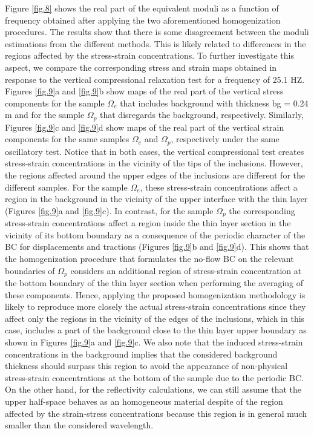 \documentclass[draft]{agujournal2019}
\begin{document}
Figure \ref{fig.8} shows the real part of the  equivalent moduli as a function of frequency obtained after applying the two aforementioned homogenization procedures.
The results show that there is some disagreement between the moduli estimations from the different methods.
This is likely related to differences in the regions affected by the stress-strain concentrations. To further investigate this aspect, we compare the corresponding stress and strain maps obtained in response to the vertical compressional relaxation test for a frequency of 25.1 HZ. Figures \ref{fig.9}a and \ref{fig.9}b show maps of the real part of the vertical stress components for the sample $\Omega_e$ that includes background with thickness bg = 0.24 m and for the sample $\Omega_p$ that disregards the background, respectively. Similarly, Figures \ref{fig.9}c and \ref{fig.9}d show maps of the real part of the vertical strain components for the same samples  $\Omega_e$ and $\Omega_p$, respectively under the same oscillatory test. Notice that in both cases, the vertical compressional test creates stress-strain concentrations in the vicinity of the tips of the inclusions. However, the regions affected around the upper edges of the inclusions are different for the different samples. For the sample $\Omega_e$, these stress-strain concentrations affect a region in the background in the vicinity of the upper interface with the thin layer (Figures \ref{fig.9}a and \ref{fig.9}c). In contrast, for the sample $\Omega_p$  the corresponding stress-strain concentrations affect a region inside the thin layer section in the vicinity of its bottom boundary as a consequence of the periodic character of the BC for displacements and tractions (Figures \ref{fig.9}b and \ref{fig.9}d). This shows that the homogenization procedure that formulates the no-flow BC on the relevant boundaries of $\Omega_p$ considers an additional region of stress-strain concentration at the bottom boundary of the thin layer section when performing the averaging of these components. Hence, applying the proposed homogenization methodology is likely to reproduce more closely the actual stress-strain concentrations since they affect only the regions in the vicinity of the edges of the inclusions, which in this case, includes a part of the background close to the thin layer upper boundary as shown in Figures \ref{fig.9}a and \ref{fig.9}c.  We also note that the induced stress-strain concentrations in the background implies that the considered background thickness should surpass this region to avoid the appearance of non-physical stress-strain concentrations at the bottom of the sample due to the periodic BC. On the other hand, for the reflectivity calculations, we can still assume that the upper half-space behaves as an homogeneous material despite of the region affected by the strain-stress concentrations because this region is in general much smaller than the considered wavelength.
\end{document}
